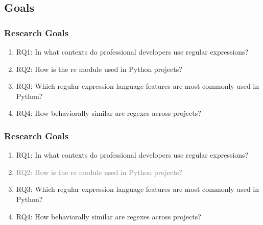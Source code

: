 
\subsection{Goals}

\begin{frame}
\frametitle{Research Goals}

\begin{enumerate}
\item RQ1: In what contexts do professional developers use regular expressions?
\item RQ2: How is the re module used in Python projects?
\item RQ3: Which regular expression language features are most commonly used in Python?
\item RQ4: How behaviorally similar are regexes across projects?
\end{enumerate}

\end{frame}

\begin{frame}
\frametitle{Research Goals}

\begin{enumerate}
\item RQ1: In what contexts do professional developers use regular expressions?
\item \textcolor{gray}{RQ2: How is the re module used in Python projects?}
\item RQ3: Which regular expression language features are most commonly used in Python?
\item RQ4: How behaviorally similar are regexes across projects?
\end{enumerate}

\end{frame}
